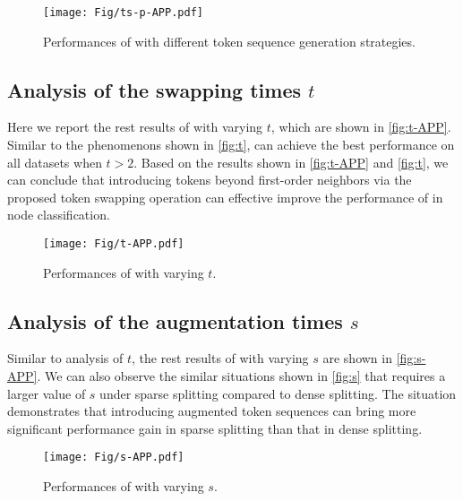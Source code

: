 \begin{figure}[ht]
\centering
\texttt{[image: Fig/ts-p-APP.pdf]}
\caption{
Performances of \name with different token sequence generation strategies.
}
\label{fig:ts-APP}
\end{figure}



\subsection{Analysis of the swapping times $t$}\label{app:exp-t}
Here we report the rest results of \name with varying $t$, which are shown in \autoref{fig:t-APP}.
Similar to the phenomenons shown in \autoref{fig:t}, \name can achieve the best performance on all datasets when $t>2$.
Based on the results shown in \autoref{fig:t-APP} and \autoref{fig:t}, we can conclude that introducing tokens beyond first-order neighbors via the proposed token swapping operation can effective improve the performance of \name in node classification.


\begin{figure}[ht]
\centering
\texttt{[image: Fig/t-APP.pdf]}
\caption{
Performances of \name with varying $t$.
}
\label{fig:t-APP}
\end{figure}



\subsection{Analysis of the augmentation times $s$}\label{app:exp-s}
Similar to analysis of $t$, the rest results of \name with varying $s$ are shown in \autoref{fig:s-APP}.
We can also observe the similar situations shown in \autoref{fig:s} that \name requires a larger value of $s$ under sparse splitting compared to dense splitting.
The situation demonstrates that introducing augmented token sequences can bring more significant performance gain in sparse splitting than that in dense splitting. 




\begin{figure}[t]
\centering
\texttt{[image: Fig/s-APP.pdf]}
\caption{
Performances of \name with varying $s$.
}
\label{fig:s-APP}
\end{figure}